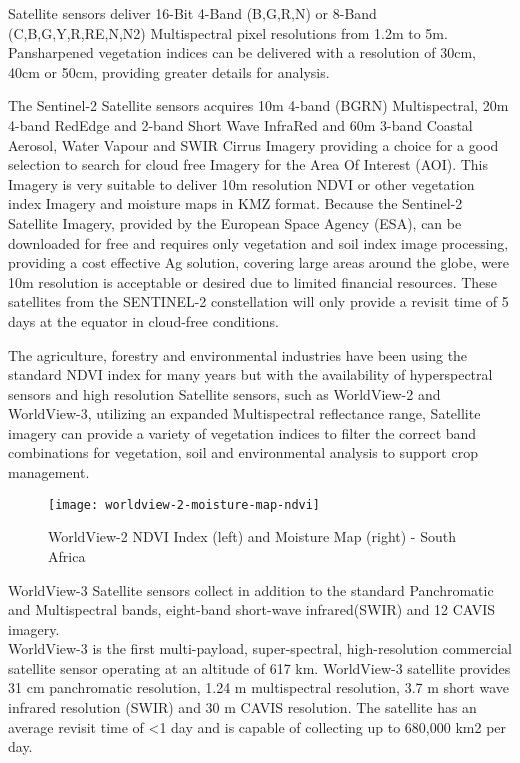 Satellite sensors deliver 16-Bit 4-Band (B,G,R,N) or 8-Band (C,B,G,Y,R,RE,N,N2) Multispectral pixel resolutions from 1.2m to 5m. Pansharpened vegetation indices can be delivered with a resolution of 30cm, 40cm or 50cm, providing greater details for analysis. 

The Sentinel-2 Satellite sensors acquires 10m 4-band (BGRN) Multispectral, 20m 4-band RedEdge and 2-band Short Wave InfraRed and 60m 3-band Coastal Aerosol, Water Vapour and SWIR Cirrus Imagery providing a choice for a good selection to search for cloud free Imagery for the Area Of Interest (AOI). This Imagery is very suitable to deliver 10m resolution NDVI or other vegetation index Imagery and moisture maps in KMZ format. Because the Sentinel-2 Satellite Imagery, provided by the European Space Agency (ESA), can be downloaded for free and requires only vegetation and soil index image processing, providing a cost effective Ag solution, covering large areas around the globe, were 10m resolution is acceptable or desired due to limited financial resources. These satellites from the SENTINEL-2 constellation will only provide a revisit time of 5 days at the equator in cloud-free conditions.

The agriculture, forestry and environmental industries have been using the standard NDVI index for many years but with the availability of hyperspectral sensors and high resolution Satellite sensors, such as WorldView-2 and WorldView-3, utilizing an expanded Multispectral reflectance range, Satellite imagery can provide a variety of vegetation indices to filter the correct band combinations for vegetation, soil and environmental analysis to support crop management.

\begin{figure}[htbp]
  \centering
  \texttt{[image: worldview-2-moisture-map-ndvi]}
  \caption{WorldView-2 NDVI Index (left) and Moisture Map (right) - South Africa}
  \label{fig:worldview-2-moisture-map-ndvi}
\end{figure}


WorldView-3 Satellite sensors collect in addition to the standard Panchromatic and Multispectral bands, eight-band short-wave infrared(SWIR) and 12 CAVIS imagery.\\\mbox{WorldView-3} is the first multi-payload, super-spectral, high-resolution commercial satellite sensor operating at an altitude of 617 km. WorldView-3 satellite provides 31 cm panchromatic resolution, 1.24 m multispectral resolution, 3.7 m short wave infrared resolution (SWIR) and 30 m CAVIS resolution. The satellite has an average revisit time of <1 day and is capable of collecting up to 680,000 km2 per day.

